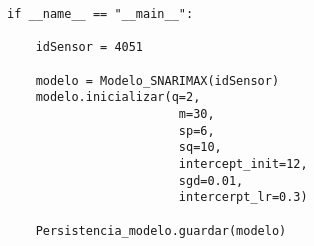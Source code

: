 \begin{verbatim}
if __name__ == "__main__":

    idSensor = 4051

    modelo = Modelo_SNARIMAX(idSensor)
    modelo.inicializar(q=2,
                        m=30,
                        sp=6,
                        sq=10,
                        intercept_init=12,
                        sgd=0.01, 
                        intercerpt_lr=0.3)

    Persistencia_modelo.guardar(modelo)

\end{verbatim}
\begin{comment}
\subsubsection{Detrender}
El modelo Detrender se caracteriza por eliminar tendencias en series de tiempo, 
centra el target u objetivo en 0 

\begin{verbatim}
    def _inicializar(self):

        extract_features = compose.TransformerUnion(Modelo._get_ordinal_date)

        scale = preprocessing.StandardScaler()

        learn = linear_model.LinearRegression(
            intercept_lr=self.intercept_lr,
            optimizer=optim.SGD(self.sgd)
        )

        model = extract_features | scale | learn

        model = time_series.Detrender(regressor=model, window_size=self.window)


        return model
\end{verbatim}

\subsubsection{SNARIMAX}

SNARIMAX por sus siglas (S)easonal (N)on-linear (A)uto(R)egressive (I)ntegrated (M)oving-(A)verage with e(X)ogenous.

Este modelo asume que los datos de entrenamiento recibidos están ordenados por tiempo y espaciados uniformemente.

Componentes:
\begin{itemize}
    \item \textbf{Seasonal - Non-linear}: No es necesario utilizar una regresión lineal, se puede utilizar cualquier tipo de regresión.
    \item \textbf{Autoregredive}:
    \item \textbf{Integrated}:
    \item \textbf{Moving-Avarage}:
    \item \textbf{Exogenous}: Se pueden implementar funciones adicionales.
\end{itemize}


\end{comment}
